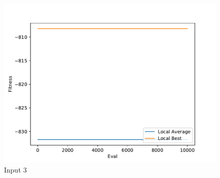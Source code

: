 \documentclass{standalone}
\begin{document}
\begin{figure}[!htb]
	\caption{Input 3}
	\label{fig:graph_3038}
	\includegraphics[width=\textwidth]{../graphs/graphs/3038.pdf}
\end{figure}
\end{document}
